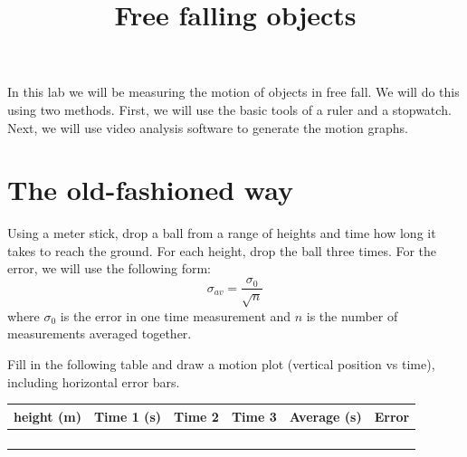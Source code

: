 \documentclass{handout}
\title{Free falling objects}
\begin{document}
\maketitle

In this lab we will be measuring the motion of objects in free fall. We will do this using two methods. First, we will use the basic tools of a ruler and a stopwatch. Next, we will use video analysis software to generate the motion graphs.

\section{The old-fashioned way}
Using a meter stick, drop a ball from a range of heights and time how long it takes to reach the ground. For each height, drop the ball three times. For the error, we will use the following form:
$$
\sigma_{av}= \frac{\sigma_0}{\sqrt{n}}
$$
where $\sigma_0$ is the error in one time measurement and $n$ is the number of measurements averaged together.

\begin{questions}
    \question Fill in the following table and draw a motion plot (vertical position vs time), including horizontal error bars.
\end{questions}

\vspace{\baselineskip}
\begin{tabular}{c|c c c| c l}
     height (m) & Time 1 (s) & Time 2 & Time 3 & Average (s) & Error \\ \hline
     \\[2\baselineskip] \hline
     \\[2\baselineskip] \hline
     \\[2\baselineskip] \hline
     \\[2\baselineskip] \hline
\end{tabular}
\end{document}
